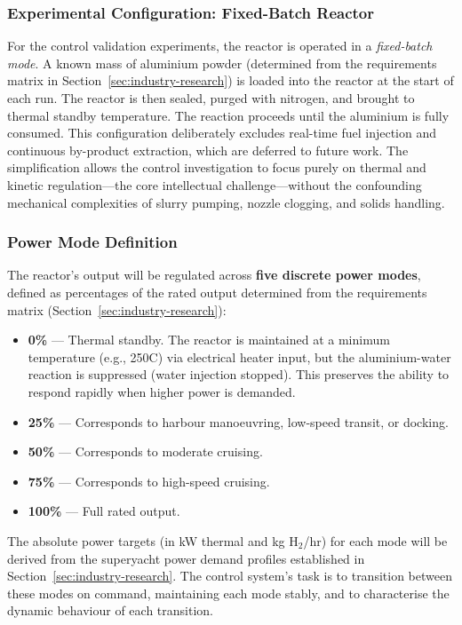 \documentclass[12pt]{article}
\begin{document}
\subsubsection*{Experimental Configuration: Fixed-Batch Reactor}

For the control validation experiments, the reactor is operated in a \emph{fixed-batch 
mode}. A known mass of aluminium powder (determined from the requirements matrix in 
Section~\ref{sec:industry-research}) is loaded into the reactor at the start of each 
run. The reactor is then sealed, purged with nitrogen, and brought to thermal 
standby temperature. The reaction proceeds until the aluminium is fully consumed. 
This configuration deliberately excludes real-time fuel injection and continuous 
by-product extraction, which are deferred to future work. The simplification allows 
the control investigation to focus purely on thermal and kinetic regulation---the 
core intellectual challenge---without the confounding mechanical complexities of 
slurry pumping, nozzle clogging, and solids handling.

\subsubsection*{Power Mode Definition}

The reactor's output will be regulated across \textbf{five discrete power modes}, 
defined as percentages of the rated output determined from the requirements matrix 
(Section~\ref{sec:industry-research}):

\begin{itemize}
    \item \textbf{0\%} --- Thermal standby. The reactor is maintained at a minimum 
    temperature (e.g., 250\textdegree C) via electrical heater input, but the 
    aluminium-water reaction is suppressed (water injection stopped). This preserves 
    the ability to respond rapidly when higher power is demanded.
    \item \textbf{25\%} --- Corresponds to harbour manoeuvring, low-speed transit, 
    or docking.
    \item \textbf{50\%} --- Corresponds to moderate cruising.
    \item \textbf{75\%} --- Corresponds to high-speed cruising.
    \item \textbf{100\%} --- Full rated output.
\end{itemize}

The absolute power targets (in kW thermal and kg H$_2$/hr) for each mode will be 
derived from the superyacht power demand profiles established in 
Section~\ref{sec:industry-research}. The control system's task is to transition 
between these modes on command, maintaining each mode stably, and to characterise 
the dynamic behaviour of each transition.
\end{document}
